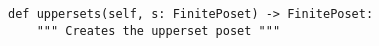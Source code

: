 \begin{verbatim}
def uppersets(self, s: FinitePoset) -> FinitePoset:
    """ Creates the upperset poset """
\end{verbatim}